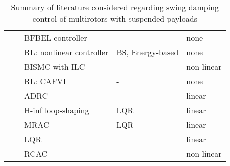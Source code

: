 \begin{landscape}
\begin{tiny}
\begin{table}[!htbp]
    \renewcommand{\arraystretch}{0.9}
    \centering
    \caption{Summary of literature considered regarding swing damping control of multirotors with suspended payloads}
    \begin{tabularx}{\linewidth}{@{}lllll@{}}
        \toprule
        \citet{Muthusamy2021a}       & \citeyear{Muthusamy2021a}       & BFBEL controller                                                       & -                                                                      & none                 \\
        \citet{Hua2021}              & \citeyear{Hua2021}              & RL: nonlinear controller                                 & BS, Energy-based                                                       & none                 \\
        \citet{Allahverdy2021}       & \citeyear{Allahverdy2021}       & BISMC with ILC                                                         & -                                                                      & non-linear           \\
        \citet{Faust2014}            & \citeyear{Faust2014}            & RL: CAFVI                                                              & -                                                                      & none                 \\
        \citet{Wang2020}             & \citeyear{Wang2020}             & ADRC                                                                   & -                                                                      & linear               \\
        \citet{Taylor2020}           & \citeyear{Taylor2020}           & H-inf loop-shaping                                            & LQR                                                                    & linear               \\
        \citet{Erasmus2020}          & \citeyear{Erasmus2020}          & MRAC                                                                   & LQR                                                                    & linear               \\
        \citet{Slabber2020}          & \citeyear{Slabber2020}          & LQR                                                                    &                                                                        & linear               \\
        \citet{Dai2014}              & \citeyear{Dai2014}              & RCAC                                                                   & -                                                                      & non-linear           \\

\end{tabularx}
\end{table}
\end{tiny}
\end{landscape}
